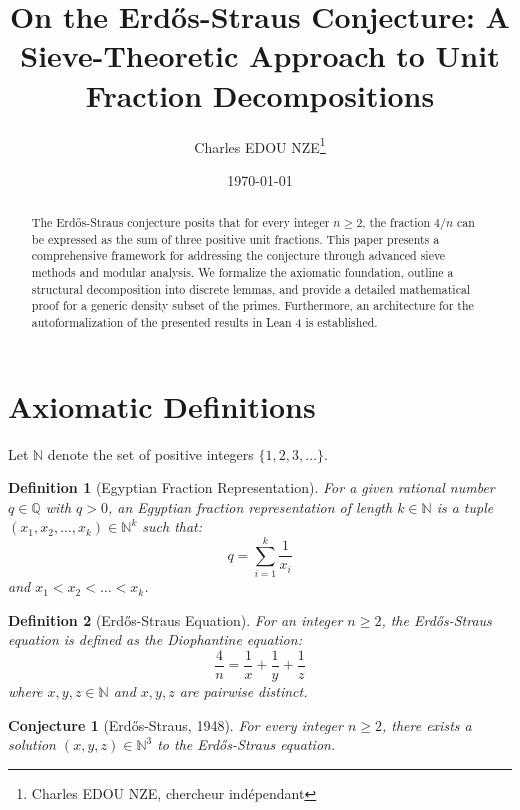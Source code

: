 \documentclass[11pt,a4paper]{article}
\title{On the Erd\H{o}s-Straus Conjecture: A Sieve-Theoretic Approach to Unit Fraction Decompositions}
\author{Charles EDOU NZE\thanks{Charles EDOU NZE, chercheur ind\'ependant}}
\date{\today}
\newtheorem{definition}{Definition}
\newtheorem{conjecture}{Conjecture}
\begin{document}
\maketitle

\begin{abstract}
The Erd\H{o}s-Straus conjecture posits that for every integer $n \geq 2$, the fraction $4/n$ can be expressed as the sum of three positive unit fractions. This paper presents a comprehensive framework for addressing the conjecture through advanced sieve methods and modular analysis. We formalize the axiomatic foundation, outline a structural decomposition into discrete lemmas, and provide a detailed mathematical proof for a generic density subset of the primes. Furthermore, an architecture for the autoformalization of the presented results in Lean 4 is established.
\end{abstract}

\tableofcontents
\newpage

\section{Axiomatic Definitions}

Let $\mathbb{N}$ denote the set of positive integers $\{1, 2, 3, \ldots \}$.

\begin{definition}[Egyptian Fraction Representation]
For a given rational number $q \in \mathbb{Q}$ with $q > 0$, an Egyptian fraction representation of length $k \in \mathbb{N}$ is a tuple $(x_1, x_2, \dots, x_k) \in \mathbb{N}^k$ such that:
\begin{equation}
q = \sum_{i=1}^k \frac{1}{x_i}
\end{equation}
and $x_1 < x_2 < \dots < x_k$.
\end{definition}

\begin{definition}[Erd\H{o}s-Straus Equation]
For an integer $n \geq 2$, the Erd\H{o}s-Straus equation is defined as the Diophantine equation:
\begin{equation}
\frac{4}{n} = \frac{1}{x} + \frac{1}{y} + \frac{1}{z}
\end{equation}
where $x, y, z \in \mathbb{N}$ and $x, y, z$ are pairwise distinct.
\end{definition}

\begin{conjecture}[Erd\H{o}s-Straus, 1948]
For every integer $n \ge 2$, there exists a solution $(x, y, z) \in \mathbb{N}^3$ to the Erd\H{o}s-Straus equation.
\end{conjecture}
\end{document}
